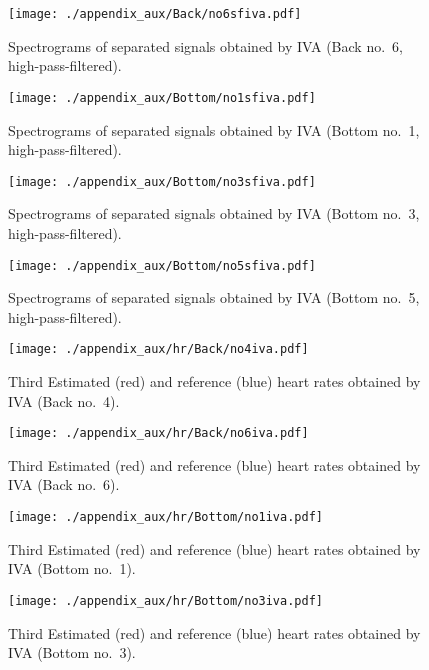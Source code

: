 \begin{figure}[tb]
\centering
\texttt{[image: ./appendix\_aux/Back/no6sfiva.pdf]}
\caption{Spectrograms of separated signals obtained by IVA (Back no.~6, high-pass-filtered).}
\end{figure}

\begin{figure}[tb]
\centering
\texttt{[image: ./appendix\_aux/Bottom/no1sfiva.pdf]}
\caption{Spectrograms of separated signals obtained by IVA (Bottom no.~1, high-pass-filtered).}
\end{figure}

\begin{figure}[tb]
\centering
\texttt{[image: ./appendix\_aux/Bottom/no3sfiva.pdf]}
\caption{Spectrograms of separated signals obtained by IVA (Bottom no.~3, high-pass-filtered).}
\end{figure}

\begin{figure}[tb]
\centering
\texttt{[image: ./appendix\_aux/Bottom/no5sfiva.pdf]}
\caption{Spectrograms of separated signals obtained by IVA (Bottom no.~5, high-pass-filtered).}
\end{figure}

\begin{figure}[tb]
\centering
\texttt{[image: ./appendix\_aux/hr/Back/no4iva.pdf]}
  \caption{Third Estimated (red) and reference (blue) heart rates obtained by IVA (Back no.~4).}
\end{figure}

\begin{figure}[tb]
\centering
\texttt{[image: ./appendix\_aux/hr/Back/no6iva.pdf]}
  \caption{Third Estimated (red) and reference (blue) heart rates obtained by IVA (Back no.~6).}
\end{figure}

\begin{figure}[tb]
\centering
\texttt{[image: ./appendix\_aux/hr/Bottom/no1iva.pdf]}
  \caption{Third Estimated (red) and reference (blue) heart rates obtained by IVA (Bottom no.~1).}
\end{figure}

\begin{figure}[tb]
\centering
\texttt{[image: ./appendix\_aux/hr/Bottom/no3iva.pdf]}
  \caption{Third Estimated (red) and reference (blue) heart rates obtained by IVA (Bottom no.~3).}
\end{figure}

